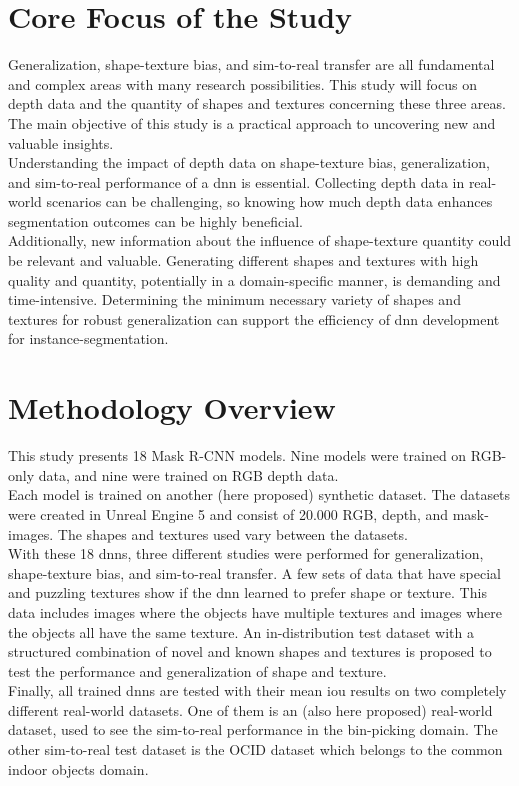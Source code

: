 	\section{Core Focus of the Study}    %
	\label{sec:core-focus-of-the-study}
		Generalization, shape-texture bias, and sim-to-real transfer are all fundamental and complex areas with many research possibilities. This study will focus on depth data and the quantity of shapes and textures concerning these three areas. The main objective of this study is a practical approach to uncovering new and valuable insights.\\
		Understanding the impact of depth data on shape-texture bias, generalization, and sim-to-real performance of a \ac{dnn} is essential. Collecting depth data in real-world scenarios can be challenging, so knowing how much depth data enhances segmentation outcomes can be highly beneficial.\\
		Additionally, new information about the influence of shape-texture quantity could be relevant and valuable. Generating different shapes and textures with high quality and quantity, potentially in a domain-specific manner, is demanding and time-intensive. Determining the minimum necessary variety of shapes and textures for robust generalization can support the efficiency of \ac{dnn} development for instance-segmentation.
		
	
	\clearpage
	\section{Methodology Overview}
	\label{sec:methodology-overview}
		This study presents 18 Mask R-CNN \cite{Kaiming2017} models. Nine models were trained on RGB-only data, and nine were trained on RGB depth data.\\
		Each model is trained on another (here proposed) synthetic dataset. The datasets were created in Unreal Engine 5 \cite{Romero2022} and consist of 20.000 RGB, depth, and mask-images. The shapes and textures used vary between the datasets.\\ 
		With these 18 \ac{dnn}s, three different studies were performed for generalization, shape-texture bias, and sim-to-real transfer. A few sets of data that have special and puzzling textures show if the \ac{dnn} learned to prefer shape or texture. This data includes images where the objects have multiple textures and images where the objects all have the same texture. An in-distribution test dataset with a structured combination of novel and known shapes and textures is proposed to test the performance and generalization of shape and texture.\\
		Finally, all trained \ac{dnn}s are tested with their mean \ac{iou} results on two completely different real-world datasets. One of them is an (also here proposed) real-world dataset, used to see the sim-to-real performance in the bin-picking domain. The other sim-to-real test dataset is the OCID dataset \cite{Suchi2019} which belongs to the common indoor objects domain. 
		
